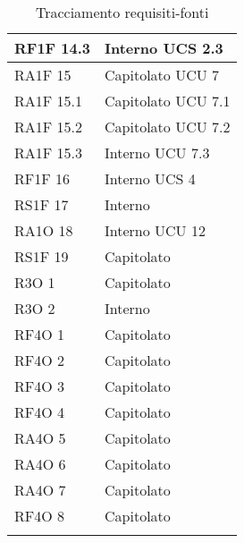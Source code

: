 \begin{center}
\begin{longtable}{ | p{5cm} | p{5cm} |}
				RF1F 14.3 &  Interno \newline  UCS 2.3 \newline  \\ \hline      
				RA1F 15 &  Capitolato \newline  UCU 7 \newline  \\ \hline      
				RA1F 15.1 &  Capitolato \newline  UCU 7.1 \newline  \\ \hline      
				RA1F 15.2 &  Capitolato \newline  UCU 7.2 \newline  \\ \hline      
				RA1F 15.3 &  Interno \newline  UCU 7.3 \newline  \\ \hline      
				RF1F 16 &  Interno \newline  UCS 4 \newline  \\ \hline      
				RS1F 17 &  Interno \newline  \\ \hline      
				RA1O 18 &  Interno \newline  UCU 12 \newline  \\ \hline      
				RS1F 19 &  Capitolato \newline  \\ \hline      
				R3O 1 &  Capitolato \newline  \\ \hline      
				R3O 2 &  Interno \newline  \\ \hline      
				RF4O 1 &  Capitolato \newline  \\ \hline      
				RF4O 2 &  Capitolato \newline  \\ \hline      
				RF4O 3 &  Capitolato \newline  \\ \hline      
				RF4O 4 &  Capitolato \newline  \\ \hline      
				RA4O 5 &  Capitolato \newline  \\ \hline      
				RA4O 6 &  Capitolato \newline  \\ \hline      
				RA4O 7 &  Capitolato \newline  \\ \hline      
				RF4O 8 &  Capitolato \newline  \\ \hline  
			\caption{Tracciamento requisiti-fonti}    
			\end{longtable}
			\egroup
			\end{center}  
\clearpage


